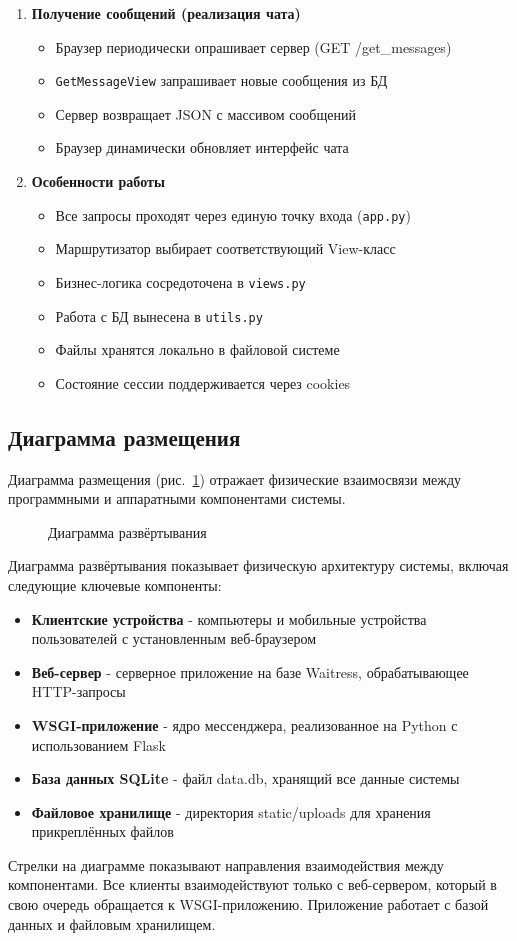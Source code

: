 \begin{enumerate}[leftmargin=*,label=\textbf{\arabic*.}]
	\item \textbf{Получение сообщений (реализация чата)}
	\begin{itemize}
		\item Браузер периодически опрашивает сервер (GET /get\_messages)
		\item \texttt{GetMessageView} запрашивает новые сообщения из БД
		\item Сервер возвращает JSON с массивом сообщений
		\item Браузер динамически обновляет интерфейс чата
	\end{itemize}
	
	\item \textbf{Особенности работы}
	\begin{itemize}
		\item Все запросы проходят через единую точку входа (\texttt{app.py})
		\item Маршрутизатор выбирает соответствующий View-класс
		\item Бизнес-логика сосредоточена в \texttt{views.py}
		\item Работа с БД вынесена в \texttt{utils.py}
		\item Файлы хранятся локально в файловой системе
		\item Состояние сессии поддерживается через cookies
	\end{itemize}
\end{enumerate}

\subsection{Диаграмма размещения}

Диаграмма размещения (рис.~\ref{place:image}) отражает физические взаимосвязи между программными и аппаратными компонентами системы.

\begin{figure}[ht]
	\caption{Диаграмма развёртывания}
	\label{place:image}
\end{figure}

Диаграмма развёртывания показывает физическую архитектуру системы, включая следующие ключевые компоненты:

\begin{itemize}
	\item \textbf{Клиентские устройства} - компьютеры и мобильные устройства пользователей с установленным веб-браузером
	\item \textbf{Веб-сервер} - серверное приложение на базе Waitress, обрабатывающее HTTP-запросы
	\item \textbf{WSGI-приложение} - ядро мессенджера, реализованное на Python с использованием Flask
	\item \textbf{База данных SQLite} - файл data.db, хранящий все данные системы
	\item \textbf{Файловое хранилище} - директория static/uploads для хранения прикреплённых файлов
\end{itemize}

Стрелки на диаграмме показывают направления взаимодействия между компонентами. Все клиенты взаимодействуют только с веб-сервером, который в свою очередь обращается к WSGI-приложению. Приложение работает с базой данных и файловым хранилищем.
